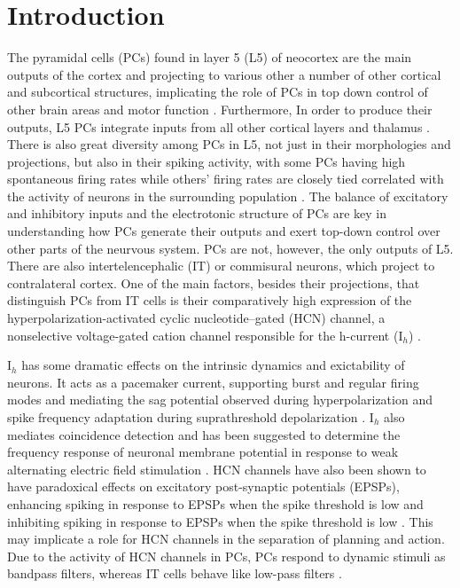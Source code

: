 \documentclass[utf8]{frontiersSCNS} %
\begin{document}
\section{Introduction}
The pyramidal cells (PCs) found in layer 5 (L5) of neocortex are the main outputs of the cortex and projecting to various other
a number of other cortical and subcortical structures, implicating the role of PCs in top down control of other brain areas and 
motor function \citep{Levesque1996-hf, Veinante2000-gg, Hattox2007-km, Aronoff2010-do, Harris2015-te, Naka2016-rn}.  Furthermore,
In order to produce their outputs, L5 PCs integrate inputs from all other cortical layers and thalamus \citep{Agmon1992-mi, 
Meyer2010-pe, Wimmer2010-lq, Oberlaender2012-fh, Rah2013-kr, Markram2015-zg}. There is also great diversity among PCs in L5, not just
in their  morphologies and projections, but also in their spiking activity, with some PCs having high spontaneous firing rates while 
others' firing rates are closely tied correlated with the activity of neurons in the surrounding population \citep{Markram2015-zg}.
The balance of excitatory and inhibitory inputs and the electrotonic structure of PCs are key in understanding how PCs generate their
outputs and exert top-down control over other parts of the neurvous system.  PCs are not, however, the only outputs of L5.  There are
also intertelencephalic (IT) or commisural neurons, which project to contralateral cortex.  One of the main factors, besides their
projections, that distinguish PCs from IT cells is their comparatively high expression of the hyperpolarization-activated cyclic 
nucleotide–gated (HCN) channel, a nonselective voltage-gated cation channel responsible for the h-current (I$_h$) \citep{Oswald2013-lh}.

I$_h$ has some dramatic effects on the intrinsic dynamics and exictability of neurons.  It acts as a pacemaker current, supporting burst
and regular firing modes and mediating the sag potential observed during hyperpolarization and spike frequency adaptation during
suprathreshold depolarization \citep{Robinson2003-uc, Oswald2013-lh}. I$_h$ also mediates coincidence detection \citep{Das2015-mh, Dewell2019-ra} 
and has been suggested to determine the frequency response of neuronal membrane potential in response to weak 
alternating electric field stimulation \citep{Toloza2018-vh}.  HCN channels have also been shown to have paradoxical effects on 
excitatory post-synaptic potentials (EPSPs), enhancing spiking in response to EPSPs when the spike threshold is low and inhibiting 
spiking in response to EPSPs when the spike threshold is low \citep{George2009-ad}.  This may implicate a role for HCN channels in the 
separation of planning and action.  Due to the activity of HCN channels in PCs, PCs respond to dynamic stimuli as bandpass filters, 
whereas IT cells behave like low-pass filters \citep{Dembrow2010-lb}.
\end{document}
